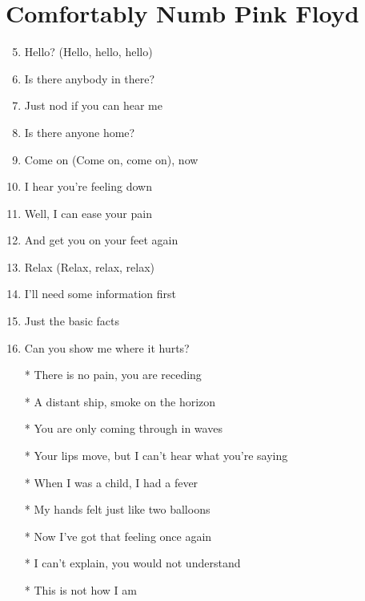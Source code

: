 \documentclass{article}
\begin{document}
    
    \section*{Comfortably Numb \by Pink Floyd}

    \begin{enumerate}
        
        \item[]
        \item[] \intro

        \item[]
        \item[] 
        \item Hello? (Hello, hello, hello)
        \item Is there anybody in there?
        \item Just nod if you can hear me
        \item Is there anyone home?
        \item Come on (Come on, come on), now
        \item I hear you're feeling down
        \item Well, I can ease your pain
        \item And get you on your feet again
        \item Relax (Relax, relax, relax)
        \item I'll need some information first
        \item Just the basic facts
        \item Can you show me where it hurts?

        \item[]
        \item[] \chorus
        \item[*] There is no pain, you are receding
        \item[*] A distant ship, smoke on the horizon
        \item[*] You are only coming through in waves
        \item[*] Your lips move, but I can't hear what you're saying
        \item[*] When I was a child, I had a fever
        \item[*] My hands felt just like two balloons
        \item[*] Now I've got that feeling once again
        \item[*] I can't explain, you would not understand
        \item[*] This is not how I am


\end{enumerate}
\end{document}
